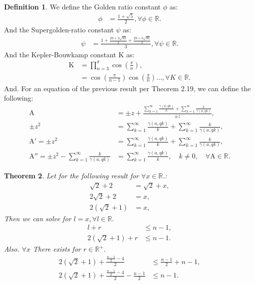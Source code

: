 \documentclass[10pt]{article}
\theoremstyle{plain}
\newtheorem{theorem}{Theorem}[section]
\theoremstyle{definition}
\newtheorem{definition}[theorem]{Definition}
\theoremstyle{remark}
\begin{document}
\begin{definition}
	We define the Golden ratio constant $\phi$ as:
	\begin{align*}
		\phi &= \frac{1+\sqrt{5}}{2}, \forall \phi \in \mathbb{R}.
	\end{align*}
	And the Supergolden-ratio constant $\psi$ as:
	\begin{align*}
		\psi &= \frac{1+\frac{29+3\sqrt{93}}{2}+\frac{29+3\sqrt{93}}{2}}{3}, \forall \psi \in \mathbb{R}.
	\end{align*}
	And the Kepler-Bouwkamp constant $\mathrm{K}$ as:
	\begin{align*}
		\mathrm{K} &= \prod_{n=3}^{\pi} \cos(\frac{\pi}{n}),\\
		&= \cos(\frac{\pi}{n-1}) \cos(\frac{\pi}{n}) \dots, \forall K \in \mathbb{R}.
	\end{align*}
	And. For an equation of the previous result per Theorem 2.19, we can define the following:
	\begin{align*}
		\mathrm{A} &= \pm z + \frac{\sum_{k=1}^{\infty} \frac{\gamma(a, qk)}{k} + \sum_{k=1}^{\infty}\frac{k}{\gamma(a, qk)}}{\pm z},\\
		\pm z^2 &= \sum_{k=1}^{\infty} \frac{\gamma(a, qk)}{k} + \sum_{k=1}^{\infty}\frac{k}{\gamma(a, qk)},\\
		\mathrm{A}' = \pm z^2 &= \sum_{k=1}^{\infty} \frac{\gamma(a, qk)}{k} + \sum_{k=1}^{\infty}\frac{k}{\gamma(a, qk)},\\
		\mathrm{A}'' = \pm z^{2} - \sum_{k=1}^{\infty}\frac{k}{\gamma(a, qk)} &= \sum_{k=1}^{\infty} \frac{\gamma(a, qk)}{k}, \quad k \neq 0, \quad \forall \mathrm{A} \in \mathbb{R}.
	\end{align*}
\end{definition}

\begin{theorem}
	Let for the following result for $\forall x \in \mathbb{R}.$:
	\begin{align*}
		\sqrt{2}+2&=\sqrt{2} + x,\\
		2\sqrt{2}+2 &=x,\\
		2(\sqrt{2} + 1) &= x,
	\end{align*}
	Then we can solve for $l=x, \forall l \in \mathbb{R}.$
	\begin{align*}
		l + r &\leq n - 1,\\
		2(\sqrt{2} + 1) + r &\leq n - 1.
	\end{align*}
	Also. $\forall x$ There exists for $r \in \mathbb{R}^{+}.$
	\begin{align*}
		2(\sqrt{2} + 1) + \frac{\frac{n - 1}{2} - 4}{2}  &\leq \frac{n - 1}{2} + n - 1,\\
		2(\sqrt{2} + 1) + \frac{\frac{n - 1}{2} - 4}{2} - \frac{n - 1}{2} &\leq n - 1.
	\end{align*}
\end{theorem}
\end{document}
